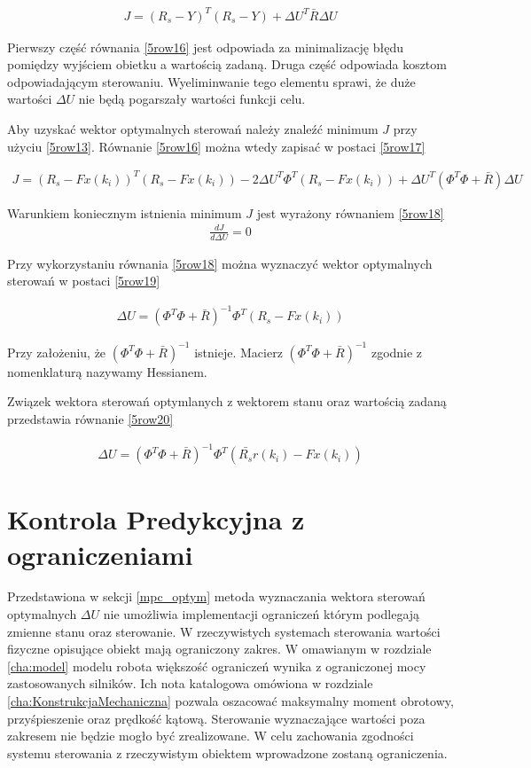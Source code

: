 \begin{gather}
\label{5row16}
J=(R_s-Y)^T(R_s-Y)+\Delta U^T \bar{R} \Delta U 
\end{gather}

Pierwszy część równania \ref{5row16} jest odpowiada za minimalizację błędu pomiędzy wyjściem obietku a wartością zadaną. Druga część odpowiada kosztom odpowiadającym sterowaniu. Wyeliminwanie tego elementu sprawi, że duże wartości $\Delta U$ nie będą pogarszały wartości funkcji celu.

Aby uzyskać wektor optymalnych sterowań należy znaleźć minimum $J$ przy użyciu \ref{5row13}. Równanie \ref{5row16} można wtedy zapisać w postaci \ref{5row17}

\begin{gather}
\label{5row17}
J=(R_s-Fx(k_i))^T(R_s-Fx(k_i))- 2\Delta U^T \Phi^T (R_s-Fx(k_i)) +\Delta U^T (\Phi^T \Phi + \bar{R}) \Delta U 
\end{gather}

Warunkiem koniecznym istnienia minimum $J$ jest wyrażony równaniem \ref{5row18}
\begin{gather}
\label{5row18}
\frac{dJ}{d\Delta U}=0
\end{gather}

Przy wykorzystaniu równania \ref{5row18} można wyznaczyć wektor optymalnych sterowań w postaci \ref{5row19}

\begin{gather}
\label{5row19}
\Delta U = (\Phi^T \Phi + \bar{R})^{-1} \Phi^T(R_s-Fx(k_i))
\end{gather}

Przy założeniu, że $(\Phi^T \Phi + \bar{R})^{-1}$ istnieje. Macierz $(\Phi^T \Phi + \bar{R})^{-1}$ zgodnie z nomenklaturą nazywamy Hessianem.

Związek wektora sterowań optymlanych z wektorem stanu oraz wartością zadaną przedstawia równanie \ref{5row20}

\begin{gather}
\label{5row20}
\Delta U = (\Phi^T \Phi + \bar{R})^{-1} \Phi^T(\bar{R_s}r(k_i)-Fx(k_i))
\end{gather}

\section{Kontrola Predykcyjna z ograniczeniami}

Przedstawiona w sekcji \ref{mpc_optym} metoda wyznaczania wektora sterowań optymalnych $\Delta U$ nie umożliwia implementacji ograniczeń którym podlegają zmienne stanu oraz sterowanie. W rzeczywistych systemach sterowania wartości fizyczne opisujące obiekt mają ograniczony zakres. W omawianym w rozdziale \ref{cha:model} modelu robota większość ograniczeń wynika z ograniczonej mocy zastosowanych silników. Ich nota katalogowa omówiona w rozdziale \ref{cha:KonstrukcjaMechaniczna} pozwala oszacować maksymalny moment obrotowy, przyśpieszenie oraz prędkość kątową. Sterowanie wyznaczające wartości poza zakresem nie będzie mogło być zrealizowane. W celu zachowania zgodności systemu sterowania z rzeczywistym obiektem wprowadzone zostaną ograniczenia.

